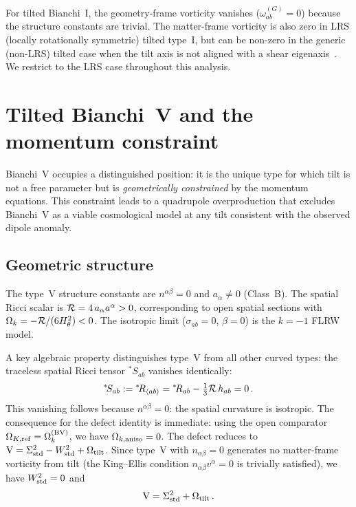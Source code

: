 For tilted Bianchi~I, the geometry-frame vorticity vanishes
($\omega_{ab}^{(G)} = 0$) because the structure constants are
trivial.  The matter-frame vorticity is also zero in LRS
(locally rotationally symmetric) tilted type~I, but can be
non-zero in the generic (non-LRS) tilted case when the tilt
axis is not aligned with a shear eigenaxis~\cite{King1973}.
We restrict to the LRS case throughout this analysis.


\section{Tilted Bianchi~V and the momentum constraint}
\label{sec:BV-tilt}

Bianchi~V occupies a distinguished position: it is the unique
type for which tilt is not a free parameter but is
\emph{geometrically constrained} by the momentum equations.
This constraint leads to a quadrupole overproduction that
excludes Bianchi~V as a viable cosmological model at any tilt
consistent with the observed dipole anomaly.


\subsection{Geometric structure}\label{sec:BV-geom}

The type~V structure constants are $n^{\alpha\beta} = 0$ and
$a_\alpha \neq 0$ (Class~B).  The spatial Ricci scalar is
$\mathcal{R} = 4\,a_\alpha a^\alpha > 0$, corresponding to open
spatial sections with $\Omega_k = -\mathcal{R}/(6H_\theta^2) < 0$.
The isotropic limit ($\sigma_{ab} = 0$, $\beta = 0$) is the
$k = -1$ FLRW model.

A key algebraic property distinguishes type~V from all other
curved types: the traceless spatial Ricci tensor ${}^*\!S_{ab}$
vanishes identically:
\begin{equation}\label{eq:BV-Sab}
{}^*\!S_{ab} := {}^*\!R_{\langle ab\rangle}
= {}^*\!R_{ab} - \tfrac{1}{3}\mathcal{R}\,h_{ab} = 0\,.
\end{equation}
This vanishing follows because $n^{\alpha\beta} = 0$: the spatial
curvature is isotropic.  The consequence for the defect identity
is immediate: using the open comparator
$\Omega_{K,\mathrm{ref}} = \Omega_k^{(\mathrm{BV})}$, we have $\Omega_{k,\mathrm{aniso}} = 0$.
The defect reduces to
$\mathrm{V} = \Sigma^2_{\mathrm{std}} - W^2_{\mathrm{std}} + \Omega_{\mathrm{tilt}}$.
Since type~V with $n_{\alpha\beta} = 0$ generates no
matter-frame vorticity from tilt (the King--Ellis condition
$n_{\alpha\beta}v^\alpha = 0$ is trivially satisfied), we have
$W^2_{\mathrm{std}} = 0$ and
\begin{equation}\label{eq:xV-simple}
\mathrm{V} = \Sigma^2_{\mathrm{std}} + \Omega_{\mathrm{tilt}}\,.
\end{equation}


